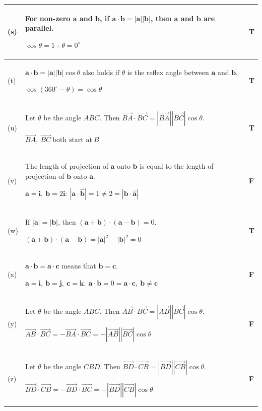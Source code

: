 \documentclass[a4paper,11pt,oneside]{book}
\providecommand{\vv}[1]{\overrightarrow{#1}}\providecommand{\cvv}[3]{\begin{pmatrix}#1\\#2\\#3\end{pmatrix}}
\begin{document}
{\begin{longtable}{|>{\centering\arraybackslash}p{0.9cm}|p{\dimexpr\linewidth-0.9cm-1.6cm-6\tabcolsep-4\arrayrulewidth\relax}|>{\centering\arraybackslash}p{1.6cm}|}
(s)&For non-zero $\mathbf a$ and $\mathbf b$, if $\mathbf a\cdot\mathbf b=|\mathbf a||\mathbf b|$, then $\mathbf a$ and $\mathbf b$ are parallel.\par\smallskip $\displaystyle \cos\theta=1\ \therefore\ \theta=0^\circ$\rule[-6pt]{0pt}{6pt}&\textbf{T}\\\hline
(t)&$\mathbf a\cdot\mathbf b=|\mathbf a||\mathbf b|\cos\theta$ also holds if $\theta$ is the reflex angle between $\mathbf a$ and $\mathbf b$.\par\smallskip $\displaystyle \cos(360^\circ-\theta)=\cos\theta$\rule[-6pt]{0pt}{6pt}&\textbf{T}\\\hline
(u)&Let $\theta$ be the angle $ABC$. Then $\vv{BA}\cdot\vv{BC}=|\vv{BA}||\vv{BC}|\cos\theta$.\par\smallskip $\displaystyle \vv{BA},\ \vv{BC}\ \text{both start at}\ B$\rule[-6pt]{0pt}{6pt}&\textbf{T}\\\hline
(v)&The length of projection of $\mathbf a$ onto $\mathbf b$ is equal to the length of projection of $\mathbf b$ onto $\mathbf a$.\par\smallskip $\displaystyle \mathbf a=\mathbf i,\ \mathbf b=2\mathbf i:\ |\mathbf a\cdot\hat{\mathbf b}|=1\neq2=|\mathbf b\cdot\hat{\mathbf a}|$\rule[-6pt]{0pt}{6pt}&\textbf{F}\\\hline
(w)&If $|\mathbf a|=|\mathbf b|$, then $(\mathbf a+\mathbf b)\cdot(\mathbf a-\mathbf b)=0$.\par\smallskip $\displaystyle (\mathbf a+\mathbf b)\cdot(\mathbf a-\mathbf b)=|\mathbf a|^2-|\mathbf b|^2=0$\rule[-6pt]{0pt}{6pt}&\textbf{T}\\\hline
(x)&$\mathbf a\cdot\mathbf b=\mathbf a\cdot\mathbf c$ means that $\mathbf b=\mathbf c$.\par\smallskip $\displaystyle \mathbf a=\mathbf i,\ \mathbf b=\mathbf j,\ \mathbf c=\mathbf k:\ \mathbf a\cdot\mathbf b=0=\mathbf a\cdot\mathbf c,\ \mathbf b\neq\mathbf c$\rule[-6pt]{0pt}{6pt}&\textbf{F}\\\hline
(y)&Let $\theta$ be the angle $ABC$. Then $\vv{AB}\cdot\vv{BC}=|\vv{AB}||\vv{BC}|\cos\theta$.\par\smallskip $\displaystyle \vv{AB}\cdot\vv{BC}=-\vv{BA}\cdot\vv{BC}=-|\vv{AB}||\vv{BC}|\cos\theta$\rule[-6pt]{0pt}{6pt}&\textbf{F}\\\hline
(z)&Let $\theta$ be the angle $CBD$. Then $\vv{BD}\cdot\vv{CB}=|\vv{BD}||\vv{CB}|\cos\theta$.\par\smallskip $\displaystyle \vv{BD}\cdot\vv{CB}=-\vv{BD}\cdot\vv{BC}=-|\vv{BD}||\vv{CB}|\cos\theta$\rule[-6pt]{0pt}{6pt}&\textbf{F}\\\hline
\end{longtable}}
\end{document}
